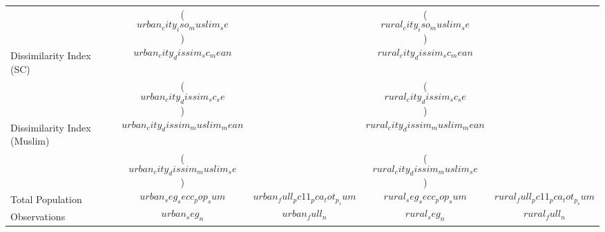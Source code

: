 {\begin{tabular}{lcccc}
                             & ($$urban_city_iso_muslim_se$$)        &                                       & ($$rural_city_iso_muslim_se$$)       &                                       \\
Dissimilarity Index (SC)     & $$urban_city_dissim_sc_mean$$         &                                       & $$rural_city_dissim_sc_mean$$        &                                       \\
                             & ($$urban_city_dissim_sc_se$$)         &                                       & ($$rural_city_dissim_sc_se$$)        &                                       \\
Dissimilarity Index (Muslim) & $$urban_city_dissim_muslim_mean$$     &                                       & $$rural_city_dissim_muslim_mean$$    &                                       \\
                             & ($$urban_city_dissim_muslim_se$$)     &                                       & ($$rural_city_dissim_muslim_se$$)    &                                       \\
  \hline 
Total Population             & $$urban_seg_secc_pop_sum$$      & $$urban_full_pc11_pca_tot_p_sum$$     & $$rural_seg_secc_pop_sum$$     & $$rural_full_pc11_pca_tot_p_sum$$     \\
Observations                 & $$urban_seg_n$$                       & $$urban_full_n$$                      & $$rural_seg_n$$                      & $$rural_full_n$$                      \\
  \hline
\end{tabular}
}
